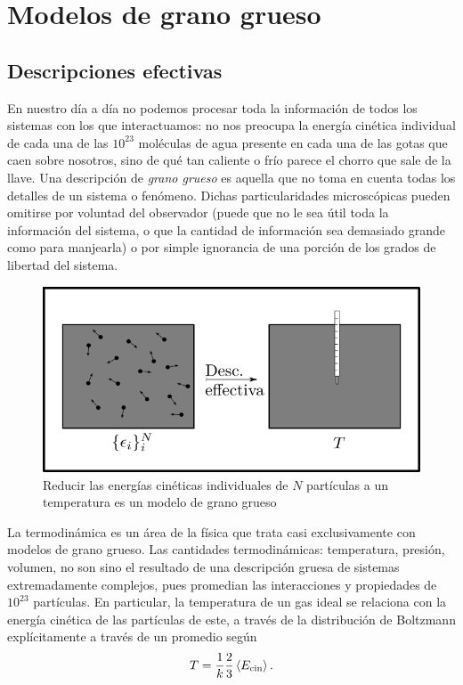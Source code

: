 \section{Modelos de grano grueso}\label{sec:Ch1CG}

\subsection{Descripciones efectivas}

En nuestro día a día no podemos procesar toda la información de todos los sistemas con los que interactuamos: no nos preocupa la energía cinética individual de cada una de las $10^{23}$ moléculas de agua presente en cada una de las gotas que caen sobre nosotros, sino de qué tan caliente o frío parece el chorro que sale de la llave. Una descripción de \textit{grano grueso} es aquella que no toma en cuenta todas los detalles de un sistema o fenómeno. Dichas particularidades microscópicas pueden omitirse por voluntad del observador (puede que no le sea útil toda la información del sistema, o que la cantidad de información sea demasiado grande como para manjearla) o por simple ignorancia de una porción de los grados de libertad del sistema.

\begin{figure}[ht]
    \centering
    \includegraphics[width=0.6\linewidth]{chapter1/figures/CGT.png}
    \caption{Reducir las energías cinéticas individuales de $N$ partículas a un temperatura es un modelo de grano grueso }
    \label{fig:KtoT}
\end{figure}


La termodinámica es un área de la física que trata casi exclusivamente con modelos de grano grueso. Las cantidades termodinámicas: temperatura, presión, volumen, no son sino el resultado de una descripción gruesa de sistemas extremadamente complejos, pues promedian las interacciones y propiedades de $10^{23}$ partículas. En particular, la temperatura de un gas ideal se relaciona con la energía cinética de las partículas de este, a través de la distribución de Boltzmann explícitamente a través de un promedio según
\begin{equation}
    T=\frac{1}{k}\frac{2}{3}\expval{E_{\text{cin}}}.
\end{equation}

